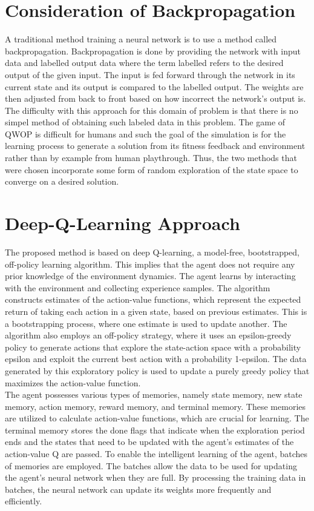 \documentclass[letterpaper]{article} %
\begin{document}
\section{Consideration of Backpropagation}
A traditional method training a neural network is to use a method called backpropagation.
Backpropagation is done by providing the network with input data and labelled output data where the term labelled refers to the desired output of the given input.
The input is fed forward through the network in its current state and its output is compared to the labelled output.
The weights are then adjusted from back to front based on how incorrect the network's output is. \\
\indent The difficulty with this approach for this domain of problem is that there is no simpel method of obtaining such labeled data in this problem.
The game of QWOP is difficult for humans and such the goal of the simulation is for the learning process to generate a solution from its fitness feedback and environment rather than by example from human playthrough.
Thus, the two methods that were chosen incorporate some form of random exploration of the state space to converge on a desired solution.\\

\section{Deep-Q-Learning Approach}
The proposed method is based on deep Q-learning, a model-free, bootstrapped, off-policy learning algorithm.
This implies that the agent does not require any prior knowledge of the environment dynamics.
The agent learns by interacting with the environment and collecting experience samples.
The algorithm constructs estimates of the action-value functions, which represent the expected return of taking each action in a given state, based on previous estimates.
This is a bootstrapping process, where one estimate is used to update another.
The algorithm also employs an off-policy strategy, where it uses an epsilon-greedy policy to generate actions that explore the state-action space with a probability epsilon and exploit the current best action with a probability 1-epsilon.
The data generated by this exploratory policy is used to update a purely greedy policy that maximizes the action-value function.\\

The agent possesses various types of memories, namely state memory, new state memory, action memory, reward memory, and terminal memory.
These memories are utilized to calculate action-value functions, which are crucial for learning.
The terminal memory stores the done flags that indicate when the exploration period ends and the states that need to be updated with the agent's estimates of the action-value Q are passed.
To enable the intelligent learning of the agent, batches of memories are employed.
The batches allow the data to be used for updating the agent's neural network when they are full.
By processing the training data in batches, the neural network can update its weights more frequently and efficiently.\\
\end{document}
